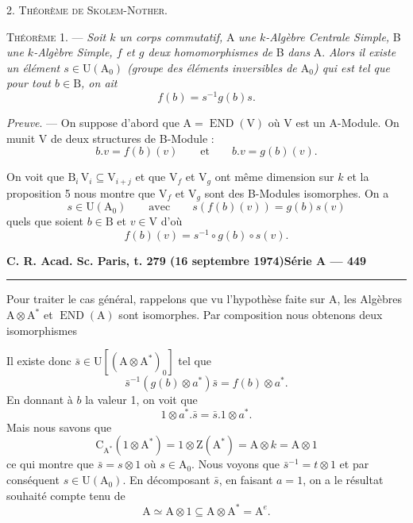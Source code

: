 2. \textsc{Théorème de Skolem-Nother}.

\textsc{Théorème 1}. — \emph{Soit $k$ un corps commutatif,} A \emph{une $k$-Algèbre Centrale Simple,} B \emph{une
$k$-Algèbre Simple, $f$ et $g$ deux homomorphismes de} B \emph{dans} A. \emph{Alors il existe un élément
$s\in\mathrm U(\mathrm A_0)$ (groupe des éléments inversibles de $\mathrm A_0$) qui est tel que pour tout $b\in\mathrm B$, on ait}
\[
f(b)=s^{-1}g(b)s.
\]

\emph{Preuve}. — On suppose d'abord que $\mathrm A=\operatorname{END}(\mathrm V)$ où V est un A-Module. On munit V
de deux structures de B-Module :
\[
b.v=f(b)(v)\qquad\text{et}\qquad b.v=g(b)(v).
\]

On voit que $\mathrm B_i\,\mathrm V_i\subseteq\mathrm V_{i+j}$ et que $\mathrm V_f$ et $\mathrm V_g$ ont même dimension sur $k$ et la proposition 5
nous montre que $\mathrm V_f$ et $\mathrm V_g$ sont des B-Modules isomorphes. On a
\[
s\in\mathrm U(\mathrm A_0)\qquad\text{avec}\qquad s(f(b)(v))=g(b)s(v)
\]
quels que soient $b\in\mathrm B$ et $v\in\mathrm V$ d'où
\[
f(b)(v)=s^{-1}\circ g(b)\circ s(v).
\]

\textbf{C. R. Acad. Sc. Paris, t. 279 (16 septembre 1974)}\hfill\textbf{Série A — 449}

\rule{\linewidth}{0.4pt}

Pour traiter le cas général, rappelons que vu l'hypothèse faite sur A, les Algèbres $\mathrm A\otimes\mathrm A^*$
et $\operatorname{END}(\mathrm A)$ sont isomorphes. Par composition nous obtenons deux isomorphismes


Il existe donc $\bar s\in\mathrm U[(\mathrm A\otimes\mathrm A^*)_0]$ tel que
\[
\bar s^{-1}(g(b)\otimes a^*)\bar s=f(b)\otimes a^*.
\]
En donnant à $b$ la valeur 1, on voit que
\[
1\otimes a^*.\bar s=\bar s.1\otimes a^*.
\]
Mais nous savons que
\[
\mathrm C_{\mathrm A^*}(1\otimes\mathrm A^*)=1\otimes\mathrm Z(\mathrm A^*)=\mathrm A\otimes k=\mathrm A\otimes1
\]
ce qui montre que $\bar s=s\otimes1$ où $s\in\mathrm A_0$. Nous voyons que $\bar s^{-1}=t\otimes1$ et par conséquent
$s\in\mathrm U(\mathrm A_0)$. En décomposant $\bar s$, en faisant $a=1$, on a le résultat souhaité compte tenu de
\[
\mathrm A\simeq\mathrm A\otimes1\subseteq\mathrm A\otimes\mathrm A^*=\mathrm A^e.
\]

